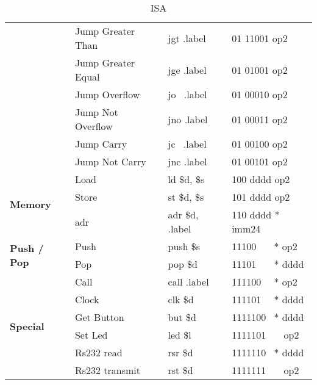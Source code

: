 \begin{table}[H]
{\begin{tabular}{|p{2cm}|l|l|l|}
 & Jump Greater Than & jgt .label & 01 11001 op2 \\ \cline{ 2- 4}
 & Jump Greater Equal & jge .label & 01 01001 op2 \\ \cline{ 2- 4}
 & Jump Overflow & jo \ .label & 01 00010 op2 \\ \cline{ 2- 4}
 & Jump Not Overflow & jno .label & 01 00011 op2 \\ \cline{ 2- 4}
 & Jump Carry & jc \ .label & 01 00100 op2 \\ \cline{ 2- 4}
 & Jump Not Carry & jnc .label & 01 00101 op2 \\ \hline
\multirow{3}{*}{\textbf{Memory}} & Load & ld \$d, \$s & 100 dddd op2 \\ \cline{ 2- 4}
 & Store & st \$d, \$s & 101 dddd op2 \\ \cline{ 2- 4}
 & adr & adr \$d, .label & 110 dddd * imm24 \\ \hline
\multirow{2}{*}{\parbox{2cm}{\textbf{Push / Pop}}} & Push & push \$s & 11100 \ \ \ * op2 \\ \cline{ 2- 4}
 & Pop & pop \$d & 11101 \ \ \ * dddd \\ \hline
\multirow{6}{*}{\textbf{Special}} & Call & call .label & 111100 \ \ * op2 \\ \cline{ 2- 4}
 & Clock & clk \$d & 111101 \ \ * dddd \\ \cline{ 2- 4}
 & Get Button & but \$d & 1111100 \ * dddd \\ \cline{ 2- 4}
 & Set Led & led \$l & 1111101 \ \ \ op2 \\ \cline{ 2- 4}
 & Rs232 read & rsr \$d & 1111110 \ * dddd \\ \cline{ 2- 4}
 & Rs232 transmit & rst \$d & 1111111 \ \ \ op2 \\ \hline
\end{tabular}
}
\caption{\label{AP:ISA}ISA}
\end{table}
